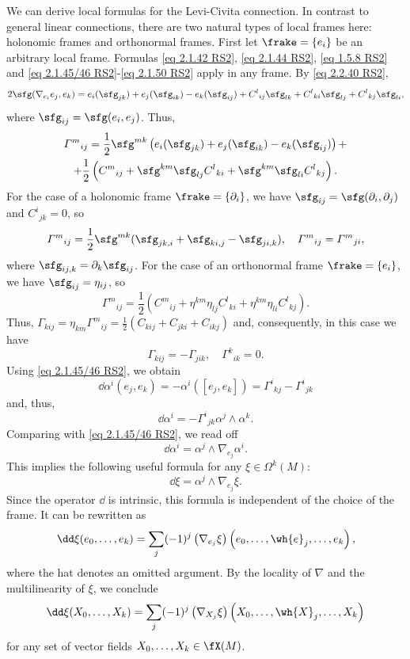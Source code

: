 \begin{rem}
    We can derive local formulas for the Levi-Civita connection. In contrast to general linear connections, there are two natural types of local frames here: holonomic frames and orthonormal frames. First let $\frake=\{e_i\}$ be an arbitrary local frame. Formulas \eqref{eq 2.1.42 RS2}, \eqref{eq 2.1.44 RS2}, \eqref{eq 1.5.8 RS2} and \eqref{eq 2.1.45/46 RS2}-\eqref{eq 2.1.50 RS2} apply in any frame. By \eqref{eq 2.2.40 RS2},
    \[2\sfg(\nabla_{e_i}e_j,e_k)=e_i(\sfg_{jk})+e_j(\sfg_{ik})-e_k(\sfg_{ij})+C^l{}_{ij}\sfg_{lk}+C^l{}_{ki}\sfg_{lj}+C^l{}_{kj}\sfg_{li},\]
    where $\sfg_{ij}=\sfg(e_i,e_j)$. Thus, 
    \begin{multline}
        \varGamma^m{}_{ij}=\frac12\sfg^{mk}\left(e_i(\sfg_{jk})+e_j(\sfg_{ik})-e_k(\sfg_{ij})\right)+\\
        +\frac12\left(C^m{}_{ij}+\sfg^{km}\sfg_{lj}C^l{}_{ki}+\sfg^{km}\sfg_{li}C^l{}_{kj}\right).\label{eq 2.2.41 RS2}
    \end{multline}
    For the case of a holonomic frame $\frake=\{\partial_i\}$, we have $\sfg_{ij}=\sfg(\partial_i,\partial_j)$ and $C^i{}_{jk}=0$, so 
    \[\varGamma^m{}_{ij}=\frac12\sfg^{mk}(\sfg_{jk,i}+\sfg_{ki,j}-\sfg_{ji,k}),\quad \varGamma^m{}_{ij}=\varGamma^m{}_{ji},\]
    where $\sfg_{ij,k}=\partial_k\sfg_{ij}$. For the case of an orthonormal frame $\frake=\{e_i\}$, we have $\sfg_{ij}=\eta_{ij}$, so 
    \[\varGamma^m{}_{ij}=\frac12\left(C^m{}_{ij}+\eta^{km}\eta_{lj}C^l{}_{ki}+\eta^{km}\eta_{li}C^l{}_{kj}\right).\]
    Thus, $\varGamma_{kij}=\eta_{km}\varGamma^m{}_{ij}=\frac12(C_{kij}+C_{jki}+C_{ikj})$ and, consequently, in this case we have 
    \[\varGamma_{kij}=-\varGamma_{jik},\quad \varGamma^k{}_{ik}=0.\]
    Using \eqref{eq 2.1.45/46 RS2}, we obtain 
    \[\dd\alpha^i(e_j,e_k)=-\alpha^i([e_j,e_k])=\varGamma^i{}_{kj}-\varGamma^i{}_{jk}\]
    and, thus,
    \[\dd\alpha^i=-\varGamma^i{}_{jk}\alpha^j\wedge\alpha^k.\]
    Comparing with \eqref{eq 2.1.45/46 RS2}, we read off 
    \[\dd\alpha^i=\alpha^j\wedge \nabla_{e_j}\alpha^i.\]
    This implies the following useful formula for any $\xi\in\Omega^k(M)$:
    \[\dd\xi=\alpha^j\wedge\nabla_{e_j}\xi.\label{eq 2.2.47 RS2}\]
    Since the operator $\dd$ is intrinsic, this formula is independent of the choice of the frame. It can be rewritten as 
    \[\dd\xi(e_0,\ldots,e_k)=\sum_j (-1)^j\left(\nabla_{e_j}\xi\right)\left(e_0,\ldots,\wh{e}_j,\ldots,e_k\right),\]
    where the hat denotes an omitted argument. By the locality of $\nabla$ and the multilinearity of $\xi$, we conclude 
    \[\dd\xi(X_0,\ldots,X_k)=\sum_j (-1)^j\left(\nabla_{X_j}\xi\right)\left(X_0,\ldots,\wh{X}_j,\ldots,X_k\right)\label{eq 2.2.49 RS2}\]
    for any set of vector fields $X_0,\ldots,X_k\in\fX(M)$.
\end{rem}


